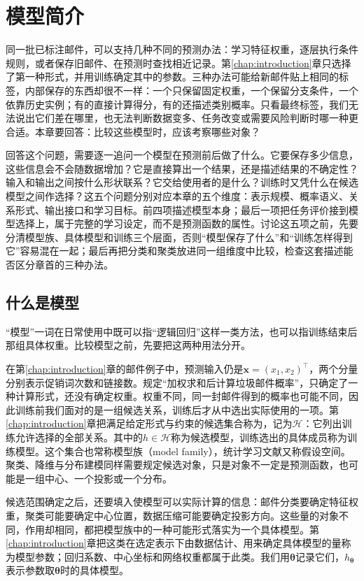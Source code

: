 \chapter{模型简介}
\label{chap:machine-learning-models}

同一批已标注邮件，可以支持几种不同的预测办法：学习特征权重，逐层执行条件规则，或者保存旧邮件、在预测时查找相近记录。第\ref{chap:introduction}章只选择了第一种形式，并用训练确定其中的参数。三种办法可能给新邮件贴上相同的标签，内部保存的东西却很不一样：一个只保留固定权重，一个保留分支条件，一个依靠历史实例；有的直接计算得分，有的还描述类别概率。只看最终标签，我们无法说出它们差在哪里，也无法判断数据变多、任务改变或需要风险判断时哪一种更合适。本章要回答：比较这些模型时，应该考察哪些对象？

回答这个问题，需要逐一追问一个模型在预测前后做了什么。它要保存多少信息，这些信息会不会随数据增加？它是直接算出一个结果，还是描述结果的不确定性？输入和输出之间按什么形状联系？它交给使用者的是什么？训练时又凭什么在候选模型之间作选择？这五个问题分别对应本章的五个维度：表示规模、概率语义、关系形式、输出接口和学习目标。前四项描述模型本身；最后一项把任务评价接到模型选择上，属于完整的学习设定，而不是预测函数的属性。讨论这五项之前，先要分清模型族、具体模型和训练三个层面，否则“模型保存了什么”和“训练怎样得到它”容易混在一起；最后再把分类和聚类放进同一组维度中比较，检查这套描述能否区分章首的三种办法。

\section{什么是模型}
\label{sec:models-meaning}

“模型”一词在日常使用中既可以指“逻辑回归”这样一类方法，也可以指训练结束后那组具体权重。比较模型之前，先要把这两种用法分开。

在第\ref{chap:introduction}章的邮件例子中，预测输入仍是$\bm{x}=(x_1,x_2)^{\top}$，两个分量分别表示促销词次数和链接数。规定“加权求和后计算垃圾邮件概率”，只确定了一种计算形式，还没有确定权重。权重不同，同一封邮件得到的概率也可能不同，因此训练前我们面对的是一组候选关系，训练后才从中选出实际使用的一项。第\ref{chap:introduction}章把满足给定形式与约束的候选集合称为，记为$\mathcal{H}$：它列出训练允许选择的全部关系。其中的$h\in\mathcal{H}$称为候选模型，训练选出的具体成员称为训练模型。这个集合也常称模型族（model family），统计学习文献又称假设空间。聚类、降维与分布建模同样需要规定候选对象，只是对象不一定是预测函数，也可能是一组中心、一个投影或一个分布。

候选范围确定之后，还要填入使模型可以实际计算的信息：邮件分类要确定特征权重，聚类可能要确定中心位置，数据压缩可能要确定投影方向。这些量的对象不同，作用却相同，都把模型族中的一种可能形式落实为一个具体模型。第\ref{chap:introduction}章把这类在选定表示下由数据估计、用来确定具体模型的量称为模型参数；回归系数、中心坐标和网络权重都属于此类。我们用$\bm{\theta}$记录它们，$h_{\bm{\theta}}$表示参数取$\bm{\theta}$时的具体模型。

